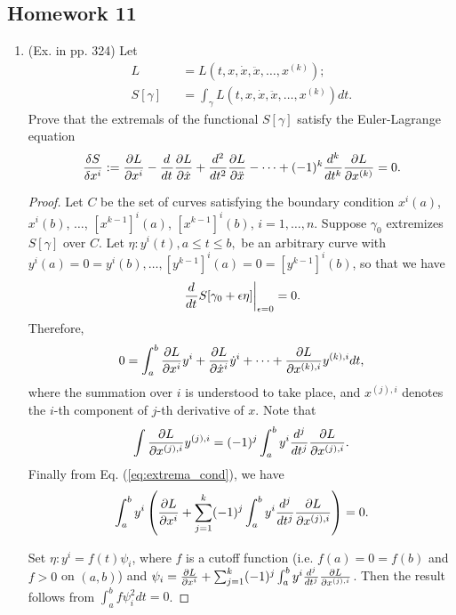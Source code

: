 \subsection{Homework 11} \label{sec:hw11}
\begin{enumerate}
	\item (Ex. in pp. 324) Let
	\begin{eqnarray}
	L &&= L(t, x, \dot{x}, \ddot{x}, \dots, x^{(k)});
	\nonumber\\
	S[\gamma] &&= \int_{\gamma} L(t, x, \dot{x}, \ddot{x}, \dots, x^{(k)}) dt.
	\end{eqnarray}
	Prove that the extremals of the functional $S[\gamma]$ satisfy the Euler-Lagrange equation
	\begin{eqnarray}
		\frac{\delta S}{\delta x^i} := \pardiff{L}{x^i} - \diff{}{t}\pardiff{L}{\dot{x}} + \diff[2]{ }{t} \pardiff{L}{\ddot{x}} - \cdots + (-1)^k \diff[k]{ }{t} \pardiff{L}{x^{(k)}} = 0.
	\end{eqnarray}
	
	\begin{proof}
		Let $C$ be the set of curves satisfying the boundary condition $x^i(a)$, $x^i(b)$, $\dots$, $[x^{k-1}]^i(a)$, $[x^{k-1}]^i(b)$, $i = 1, \dots, n$. Suppose $\gamma_0$ extremizes $S[\gamma]$ over $C$. Let $\eta: y^i(t), a \leq t \leq b,$ be an arbitrary curve with $y^i(a) = 0 = y^i(b), \dots, [y^{k-1}]^i(a) = 0 = [y^{k-1}]^i(b)$, so that we have \[ \left. \diff{ }{t} S[\gamma_0 + \epsilon \eta] \right|_{\epsilon = 0}  = 0.\] Therefore,
		\begin{eqnarray}
			0 = \int_{a}^{b} \pardiff{L}{x^i} y^i + \pardiff{L}{\dot{x}^i} \dot{y}^i + \dots + \pardiff{L}{x^{(k), i}} y^{(k), i} dt,
			\label{eq:extrema_cond}
		\end{eqnarray}
		where the summation over $i$ is understood to take place, and $x^{(j), i}$ denotes the $i$-th component of $j$-th derivative of $x$. Note that
		\[ \int \pardiff{L}{x^{(j), i}} y^{(j), i} = (-1)^{j} \int_{a}^{b} y^i \diff[j]{ }{t} \pardiff{L}{x^{(j), i}}.\]
		Finally from Eq. (\ref{eq:extrema_cond}), we have
		\begin{eqnarray}
			\int_{a}^{b} y^i \left( \pardiff{L}{x^i} + \sum_{j = 1}^{k} (-1)^{j} \int_{a}^{b} y^i \diff[j]{ }{t} \pardiff{L}{x^{(j), i}} \right) = 0.
		\end{eqnarray}
		
		Set $\eta: y^i = f(t) \psi_i$, where $f$ is a cutoff function (i.e. $f(a) = 0 = f(b)$ and $f > 0$ on $(a, b)$) and $\psi_i = \pardiff{L}{x^i} + \sum_{j = 1}^{k} (-1)^{j} \int_{a}^{b} y^i \diff[j]{ }{t} \pardiff{L}{x^{(j), i}}$. Then the result follows from $\int_{a}^{b} f \psi_i^2 dt= 0$.
	\end{proof}
	

\end{enumerate}

